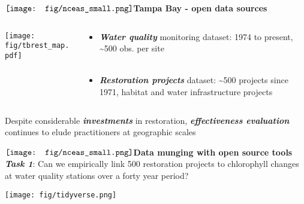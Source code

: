 \documentclass[serif]{beamer}\usepackage[]{graphicx}\usepackage[]{color}
\newcommand{\emtxt}[1]{\textbf{\textit{{\color{mypal4} #1}}}}
\begin{document}
\begin{frame}{{$\vcenter{\hbox{\texttt{[image: fig/nceas\_small.png]}}}$\hspace{0.07in}\textbf{Tampa Bay - open data sources}}}
\begin{columns}
\begin{column}{0.5\textwidth}
\onslide<+->
\begin{center}
\texttt{[image: fig/tbrest\_map.pdf]}
\end{center}
\end{column}
\begin{column}{0.5\textwidth}
\begin{itemize}
\item \emtxt{Water quality} monitoring dataset: 1974 to present, \textasciitilde 500 obs. per site \\~\\
\item<+-> \emtxt{Restoration projects} dataset: \textasciitilde 500 projects since 1971, habitat and water infrastructure projects
\end{itemize}
\end{column}
\end{columns}
\onslide<+->
\begin{center}
Despite considerable \emtxt{investments} in restoration, \emtxt{effectiveness evaluation} continues to elude practitioners at geographic scales {\footnotesize \cite{Diefenderfer16}}
\end{center}
\end{frame}

\begin{frame}[t]{{$\vcenter{\hbox{\texttt{[image: fig/nceas\_small.png]}}}$\hspace{0.07in}\textbf{Data munging with open source tools}}}
\emtxt{Task 1}: Can we empirically link 500 restoration projects to chlorophyll changes at water quality stations over a forty year period? 
\vfill
\centerline{\texttt{[image: fig/tidyverse.png]}}
\end{frame}
\end{document}
